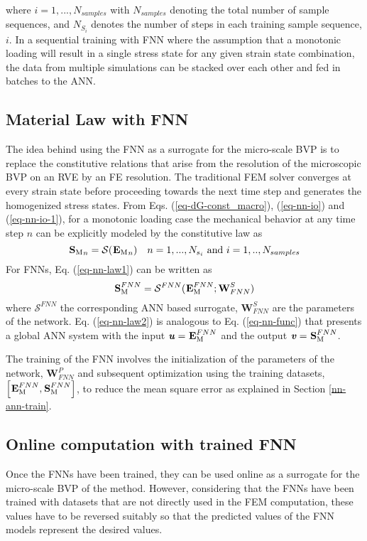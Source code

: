where $ i= 1,...,N_{samples} $ with $ N_{samples} $ denoting the total number of sample sequences, and $ N_{S_i} $ denotes the number of steps in each training sample sequence, $ i $. In a sequential training with FNN where the assumption that a monotonic loading will result in a single stress state for any given strain state combination, the data from multiple simulations can be stacked over each other and fed in batches to the ANN. 


\subsection{Material Law with FNN}\label{nn-mono-material}
The idea behind using the FNN as a surrogate for the micro-scale BVP is to replace the constitutive relations that arise from the resolution of the microscopic BVP on an RVE by an FE resolution. The traditional FEM solver converges at every strain state before proceeding towards the next time step and generates the homogenized stress states. 
From Eqs. (\ref{eq-dG-const_macro}), (\ref{eq-nn-io}) and (\ref{eq-nn-io-1}), for a monotonic loading case the mechanical behavior at any time step $ n $ can be explicitly modeled by the constitutive law as
\begin{equation}\label{eq-nn-law1}
{\tgm[]{S}}_n=\mathcal{S}({\tgm[]{E}}_n)\quad n=1,...,N_{s_i}\text{ and }i=1,..,N_{samples}
\end{equation}
For FNNs, Eq. (\ref{eq-nn-law1}) can be written as
\begin{equation}\label{eq-nn-law2}
\tgm[]{S}^{FNN}=\mathcal{S}^{FNN}(\tgm[]{E}^{FNN};\textbf{W}^S_{FNN})
\end{equation}
where $ \mathcal{S}^{FNN} $ the corresponding ANN based surrogate, $ \textbf{W}^S_{FNN} $ are the parameters of the network. Eq. (\ref{eq-nn-law2}) is analogous to Eq. (\ref{eq-nn-func}) that presents a global ANN system with the input $ \textbf{\textit{u}}=\tgm[]{E}^{FNN} $ and the output $ \textbf{\textit{v}}=\tgm[]{S}^{FNN} $.

The training of the FNN involves the initialization of the parameters of the network, $ \textbf{W}^P_{FNN} $ and subsequent optimization using the training datasets, $ \left[\tgm{E}^{FNN},\tgm{S}^{FNN}\right] $, to reduce the mean square error as explained in Section \ref{nn-ann-train}.

\subsection{Online computation with trained FNN}\label{nn-mono-train}
Once the FNNs have been trained, they can be used online as a surrogate for the micro-scale BVP of the \fee method. However, considering that the FNNs have been trained with datasets that are not directly used in the FEM computation, these values have to be reversed suitably so that the predicted values of the FNN models represent the desired values.

